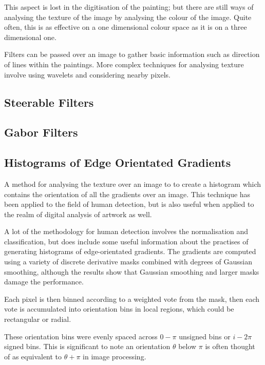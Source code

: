 \documentclass[conference]{IEEEtran}
\begin{document}
This aspect is lost in the digitisation of the painting; but there are still
ways of analysing the texture of the image by analysing the colour of the
image. Quite often, this is as effective on a one dimensional colour space as
it is on a three dimensional one.

Filters can be passed over an image to gather basic information such as
direction of lines within the paintings. More complex techniques for analysing
texture involve using wavelets and considering nearby pixels.

\subsection{Steerable Filters}

\subsection{Gabor Filters}

\subsection{Histograms of Edge Orientated Gradients}

A method for analysing the texture over an image to to create a histogram which
contains the orientation of all the gradients over an image. This technique has
been applied to the field of human detection\cite{dalal05histograms}, but is
also useful when applied to the realm of digital analysis of artwork as well.

A lot of the methodology for human detection involves the normalisation and
classification, but does include some useful information about the practises of
generating histograms of edge-orientated gradients. The gradients are computed
using a variety of discrete derivative masks combined with degrees of Gaussian
smoothing, although the results show that Gaussian smoothing and larger masks
damage the performance.

Each pixel is then binned according to a weighted vote from the mask, then each
vote is accumulated into orientation bins in local regions, which could be
rectangular or radial.

These orientation bins were evenly spaced across $0-\pi$ unsigned bins or
$i-2\pi$ signed bins. This is significant to note an orientation $\theta$ below
$\pi$ is often thought of as equivalent to $\theta + \pi$ in image processing.
\end{document}
